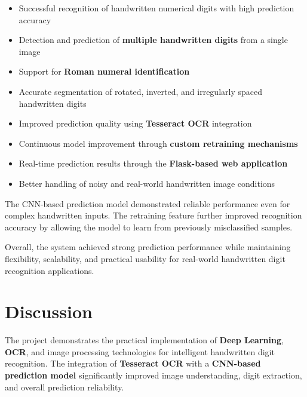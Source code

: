 \documentclass[12pt,a4paper]{article}
\begin{document}
\begin{itemize}

\item Successful recognition of handwritten numerical digits with high prediction accuracy

\item Detection and prediction of \textbf{multiple handwritten digits} from a single image

\item Support for \textbf{Roman numeral identification}

\item Accurate segmentation of rotated, inverted, and irregularly spaced handwritten digits

\item Improved prediction quality using \textbf{Tesseract OCR} integration

\item Continuous model improvement through \textbf{custom retraining mechanisms}

\item Real-time prediction results through the \textbf{Flask-based web application}

\item Better handling of noisy and real-world handwritten image conditions

\end{itemize}

\vspace{0.3cm}

\noindent
The CNN-based prediction model demonstrated reliable performance even for complex handwritten inputs. The retraining feature further improved recognition accuracy by allowing the model to learn from previously misclassified samples.

\vspace{0.3cm}

\noindent
Overall, the system achieved strong prediction performance while maintaining flexibility, scalability, and practical usability for real-world handwritten digit recognition applications.

\newpage

\section{Discussion}

\vspace{0.3cm}

\noindent
The project demonstrates the practical implementation of \textbf{Deep Learning}, \textbf{OCR}, and image processing technologies for intelligent handwritten digit recognition. The integration of \textbf{Tesseract OCR} with a \textbf{CNN-based prediction model} significantly improved image understanding, digit extraction, and overall prediction reliability.
\end{document}
